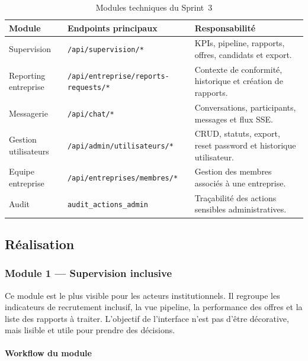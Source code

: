 \documentclass[12pt,a4paper]{report}
\begin{document}
\begin{table}[H]
\centering
\caption{Modules techniques du Sprint~3}
\label{tab:s3_services}
\renewcommand{\arraystretch}{1.35}
\begin{tabularx}{\textwidth}{|L{4.1cm}|L{4.8cm}|Y|}
\hline
{}
\textbf{Module} & \textbf{Endpoints principaux} & \textbf{Responsabilité} \\
\hline
Supervision & \texttt{/api/supervision/*} & KPIs, pipeline, rapports, offres, candidats et export. \\
\hline
Reporting entreprise & \texttt{/api/entreprise/reports-requests/*} & Contexte de conformité, historique et création de rapports. \\
\hline
Messagerie & \texttt{/api/chat/*} & Conversations, participants, messages et flux SSE. \\
\hline
Gestion utilisateurs & \texttt{/api/admin/utilisateurs/*} & CRUD, statuts, export, reset password et historique utilisateur. \\
\hline
Equipe entreprise & \texttt{/api/entreprises/membres/*} & Gestion des membres associés à une entreprise. \\
\hline
Audit & \texttt{audit\_actions\_admin} & Traçabilité des actions sensibles administratives. \\
\hline
\end{tabularx}
\end{table}

\subsection{Réalisation}

\subsubsection{Module 1 — Supervision inclusive}

Ce module est le plus visible pour les acteurs institutionnels. Il regroupe les
indicateurs de recrutement inclusif, la vue pipeline, la performance des offres et la
liste des rapports à traiter. L'objectif de l'interface n'est pas d'être décorative,
mais lisible et utile pour prendre des décisions.

\paragraph{Workflow du module}
\end{document}
